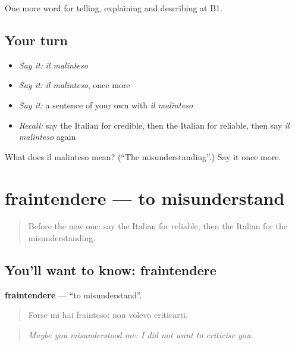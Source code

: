 \begin{grammarlens}[title={What you've built}]
One more word for telling, explaining and describing at B1.
\end{grammarlens}

\subsection*{Your turn}
\begin{itemize}
\raggedright
  \item \emph{Say it:} \emph{il malinteso}
  \item \emph{Say it:} \emph{il malinteso}, once more
  \item \emph{Say it:} a sentence of your own with \emph{il malinteso}
  \item \emph{Recall:} say the Italian for credible, then the Italian for reliable, then say \emph{il malinteso} again
\end{itemize}

\begin{tcolorbox}[breakable,colback=teal!4,colframe=teal!35!black,title={Before you move on}]
What does il malinteso mean? (\textquotedblleft{}The misunderstanding\textquotedblright{}.) Say it once more.
\end{tcolorbox}
\section[fraintendere]{fraintendere — to misunderstand}

\label{lesson:IT-C346-fraintendere}



\begin{quote}
Before the new one: say the Italian for reliable, then the Italian for the misunderstanding.
\end{quote}

\subsection*{You'll want to know: fraintendere}
\textbf{fraintendere} — \textquotedblleft{}to misunderstand\textquotedblright{}.

\begin{quote}
Forse mi hai frainteso: non volevo criticarti.
\end{quote}

\begin{quote}
\emph{Maybe you misunderstood me: I did not want to criticise you.}
\end{quote}

